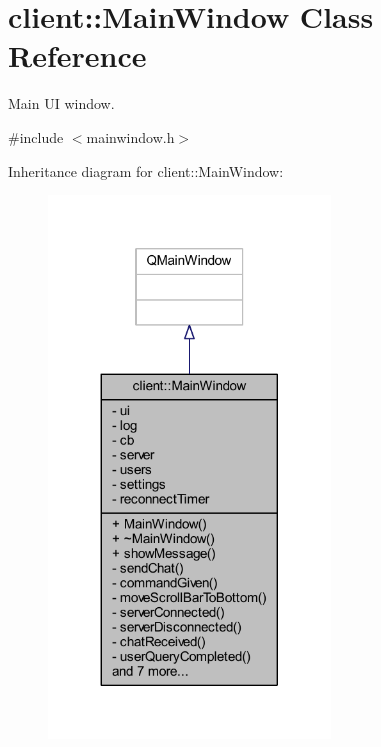 \hypertarget{classclient_1_1_main_window}{\section{client\-:\-:Main\-Window Class Reference}
\label{d2/da4/classclient_1_1_main_window}
}


Main U\-I window.  




{\ttfamily \#include $<$mainwindow.\-h$>$}



Inheritance diagram for client\-:\-:Main\-Window\-:\nopagebreak
\begin{figure}[H]
\begin{center}
\leavevmode
\includegraphics[width=212pt]{da/d6c/classclient_1_1_main_window__inherit__graph}
\end{center}
\end{figure}


